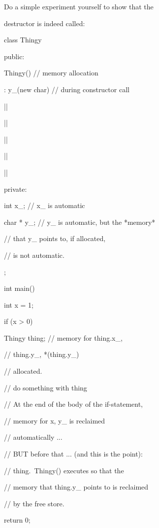 Do a simple experiment yourself to show that the

destructor is indeed called:



\begin{consolethree}[escapeinside=||]

class Thingy

{

public:

    Thingy()             // memory allocation

        : y_(new char)   // during constructor call

    {}

    ||

    |\EMPHASIZE{\{}|

        ||

        ||

    |\EMPHASIZE{\}}|

private:

    int x_;     // x_ is automatic

    char * y_;  // y_ is automatic, but the *memory*

                // that y_ points to, if allocated,

                // is not automatic.

};



int main()

{

    int x = 1;

    if (x > 0)

    {

        Thingy thing; // memory for thing.x_,

                      // thing.y_, *(thing.y_)

                      // allocated.

        // do something with thing

    } // At the end of the body of the if-statement,

      // memory for x, y_ is reclaimed

      // automatically ...

      // BUT before that ... (and this is the point):

      // thing.~Thingy() executes so that the

      // memory that thing.y_ points to is reclaimed

      // by the free store.

    return 0;

}

\end{consolethree}

